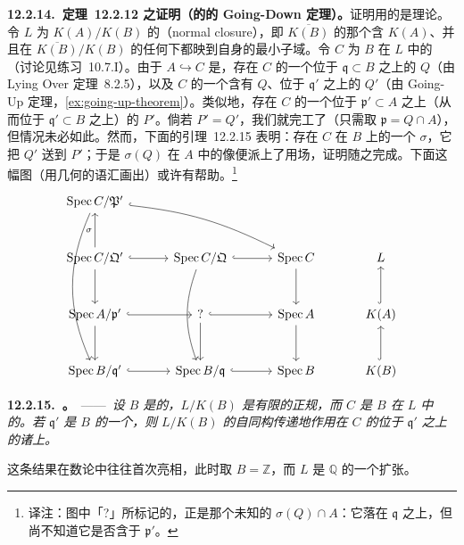 \textbf{12.2.14.\ 定理~12.2.12 之证明（\trIntegrallyClosed{}\trIntegralDomain{}的\trFinite\trExtension{}的 Going-Down 定理）。}\quad 证明用的是\trGalois{}理论。令 $L$ 为 $K(A)/K(B)$ 的\textbf{\trNormalClosure}（normal closure），即 $\overline{K(B)}$ 的那个含 $K(A)$、并且在 $\overline{K(B)}/K(B)$ 的任何\trAutomorphism{}下都映到自身的最小子域。令 $C$ 为 $B$ 在 $L$ 中的\trIntegralClosure{}（讨论见\mbox{练习~10.7.I}）。由于 $A\hookrightarrow C$ 是\trIntegralExtension，存在 $C$ 的一个位于 $\mathfrak{q}\subset B$ 之上的\trPrimeIdeal{} $Q$（由 Lying Over 定理~8.2.5），以及 $C$ 的一个含有 $Q$、位于 $\mathfrak{q}'$ 之上的\trPrimeIdeal{} $Q'$（由 Going-Up 定理，\cref{ex:going-up-theorem}）。类似地，存在 $C$ 的一个位于 $\mathfrak{p}'\subset A$ 之上（从而位于 $\mathfrak{q}'\subset B$ 之上）的\trPrimeIdeal{} $P'$。倘若 $P'=Q'$，我们就完工了（只需取 $\mathfrak{p}=Q\cap A$），但情况未必如此。然而，下面的引理~12.2.15 表明：存在 $C$ 在 $B$ 上的一个\trAutomorphism{} $\sigma$，它把 $Q'$ 送到 $P'$；于是 $\sigma(Q)$ 在 $A$ 中的像便派上了用场，证明随之完成。下面这幅图（用几何的语汇画出）或许有帮助。\footnote{译注：图中「?」所标记的，正是那个未知的\trPrimeIdeal{} $\sigma(Q)\cap A$：它落在 $\mathfrak{q}$ 之上，但尚不知道它是否含于 $\mathfrak{p}'$。}
\[
\begin{tikzcd}[row sep=2.8em, column sep=3.2em]
\Spec C/\mathfrak{P}' \ar[drr, hook, bend left=10] \ar[ddd, bend right=24] & & & \\
\Spec C/\mathfrak{Q}' \ar[u, "\sigma"] \ar[r, hook] \ar[d] &
\Spec C/\mathfrak{Q} \ar[r, hook] \ar[dd, bend right=20] &
\Spec C \ar[d] &
L \\
\Spec A/\mathfrak{p}' \ar[r, hook] \ar[d] &
\text{?} \ar[r, hook] \ar[d] &
\Spec A \ar[d] &
K(A) \ar[u, hook] \\
\Spec B/\mathfrak{q}' \ar[r, hook] &
\Spec B/\mathfrak{q} \ar[r, hook] &
\Spec B &
K(B) \ar[u, hook]
\end{tikzcd}
\]

\textbf{12.2.15.\ \trhLemma{}。}\ ——\ \emph{设 $B$ 是\trIntegrallyClosed{}的\trIntegralDomain，$L/K(B)$ 是有限的正规\trFieldExtension，而 $C$ 是 $B$ 在 $L$ 中的\trIntegralClosure。若 $\mathfrak{q}'$ 是 $B$ 的一个\trPrimeIdeal，则 $L/K(B)$ 的自同构传递地作用在 $C$ 的位于 $\mathfrak{q}'$ 之上的诸\trPrimeIdeal{}上。}

这条结果在数论中往往首次亮相，此时取 $B=\mathbb{Z}$，而 $L$ 是 $\mathbb{Q}$ 的一个\trGalois{}扩张。

